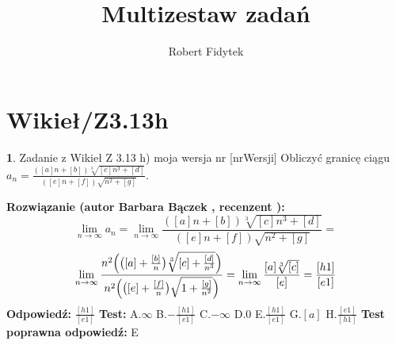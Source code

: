 \documentclass[12pt, a4paper]{article}
\title{Multizestaw zadań}
\author{Robert Fidytek}
\date{}
\theoremstyle{definition} %
\newtheorem{zad}{}
\newcommand{\kategoria}[1]{\section{#1}} %
\newcommand{\zadStart}[1]{\begin{zad}#1\newline} %
\newcommand{\zadStop}{\end{zad}}   %
\newcommand{\rozwStart}[2]{\noindent \textbf{Rozwiązanie (autor #1 , recenzent #2): }\newline} %
\newcommand{\rozwStop}{\newline}                                            %
\newcommand{\odpStart}{\noindent \textbf{Odpowiedź:}\newline}    %
\newcommand{\odpStop}{\newline}                                             %
\newcommand{\testStart}{\noindent \textbf{Test:}\newline} %
\newcommand{\testStop}{\newline} %
\newcommand{\kluczStart}{\noindent \textbf{Test poprawna odpowiedź:}\newline} %
\newcommand{\kluczStop}{\newline} %
\begin{document}
\maketitle


\kategoria{Wikieł/Z3.13h}
\zadStart{Zadanie z Wikieł Z 3.13 h) moja wersja nr [nrWersji]}
Obliczyć granicę ciągu $a_n= \frac{([a]n+[b])\sqrt[3]{[c]n^3+[d]}}{([e]n+[f])\sqrt{n^2+[g]}}$.
\zadStop
\rozwStart{Barbara Bączek}{}
$$\lim_{n \rightarrow \infty} a_n= \lim_{n \rightarrow \infty} \frac{([a]n+[b])\sqrt[3]{[c]n^3+[d]}}{([e]n+[f])\sqrt{n^2+[g]}}= $$
$$\lim_{n \rightarrow \infty} \frac{n^2\Big{(}\big{(}[a]+\frac{[b]}{n}\big{)}\sqrt[3]{[c]+\frac{[d]}{n^3}}\Big{)}}{n^2\Big{(}\big{(}[e]+\frac{[f]}{n}\big{)}\sqrt{1+\frac{[g]}{n^2}}\Big{)}}=\lim_{n \rightarrow \infty} \frac{[a] \sqrt[3]{[c]}}{[e]}=\frac{[h1]}{[e1]} $$
\rozwStop
\odpStart
$\frac{[h1]}{[e1]}$
\odpStop
\testStart
A.$\infty$
B.$-\frac{[h1]}{[e1]}$
C.$-\infty$
D.$0$
E.$\frac{[h1]}{[e1]}$
G.$[a]$
H.$\frac{[e1]}{[h1]}$
\testStop
\kluczStart
E
\kluczStop
\end{document}

